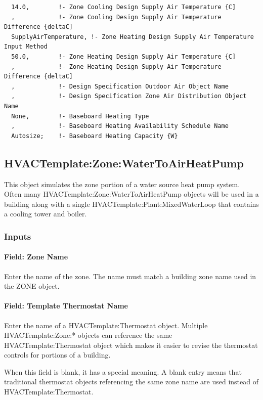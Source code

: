 \begin{lstlisting}
  14.0,        !- Zone Cooling Design Supply Air Temperature {C]
  ,            !- Zone Cooling Design Supply Air Temperature Difference {deltaC]
  SupplyAirTemperature, !- Zone Heating Design Supply Air Temperature Input Method
  50.0,        !- Zone Heating Design Supply Air Temperature {C]
  ,            !- Zone Heating Design Supply Air Temperature Difference {deltaC]
  ,            !- Design Specification Outdoor Air Object Name
  ,            !- Design Specification Zone Air Distribution Object Name
  None,        !- Baseboard Heating Type
  ,            !- Baseboard Heating Availability Schedule Name
  Autosize;    !- Baseboard Heating Capacity {W}
\end{lstlisting}

\subsection{HVACTemplate:Zone:WaterToAirHeatPump}\label{hvactemplatezonewatertoairheatpump}

This object simulates the zone portion of a water source heat pump system. Often many HVACTemplate:Zone:WaterToAirHeatPump objects will be used in a building along with a single HVACTemplate:Plant:MixedWaterLoop that contains a cooling tower and boiler.

\subsubsection{Inputs}\label{inputs-6-011}

\paragraph{Field: Zone Name}\label{field-zone-name-5-001}

Enter the name of the zone. The name must match a building zone name used in the ZONE object.

\paragraph{Field: Template Thermostat Name}\label{field-template-thermostat-name-5}

Enter the name of a HVACTemplate:Thermostat object. Multiple HVACTemplate:Zone:* objects can reference the same HVACTemplate:Thermostat object which makes it easier to revise the thermostat controls for portions of a building.

When this field is blank, it has a special meaning. A blank entry means that traditional thermostat objects referencing the same zone name are used instead of HVACTemplate:Thermostat.

